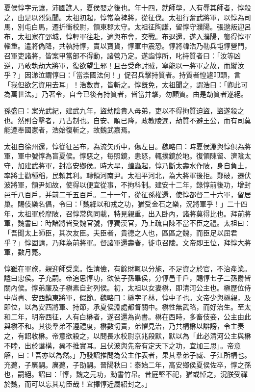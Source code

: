 
\begin{pinyinscope}
夏侯惇字元讓，沛國譙人，夏侯嬰之後也。年十四，就師學，人有辱其師者，惇殺之，由是以烈氣聞。太祖初起，惇常為裨將，從征伐。太祖行奮武將軍，以惇為司馬，別屯白馬，遷折衝校尉，領東郡太守。太祖征陶謙，留惇守濮陽。張邈叛迎呂布，太祖家在鄄城，惇輕軍往赴，適與布會，交戰。布退還，遂入濮陽，襲得惇軍輜重。遣將偽降，共執持惇，責以寶貨，惇軍中震恐。惇將韓浩乃勒兵屯惇營門，召軍吏諸將，皆案甲當部不得動，諸營乃定。遂詣惇所，叱持質者曰：「汝等凶逆，乃敢執劫大將軍，復欲望生邪！且吾受命討賊，寧能以一將軍之故，而縱汝乎？」因涕泣謂惇曰：「當柰國法何！」促召兵擊持質者。持質者惶遽叩頭，言「我但欲乞資用去耳」！浩數責，皆斬之。惇旣免，太祖聞之，謂浩曰：「卿此可為萬世法。」乃著令，自今已後有持質者，皆當并擊，勿顧質。由是劫質者遂絕。

孫盛曰：案光武紀，建武九年，盜劫陰貴人母弟，吏以不得拘質迫盜，盜遂殺之也。然則合擊者，乃古制也。自安、順已降，政教陵遲，劫質不避王公，而有司莫能遵奉國憲者，浩始復斬之，故魏武嘉焉。

太祖自徐州還，惇從征呂布，為流矢所中，傷左目。魏略曰：時夏侯淵與惇俱為將軍，軍中號惇為盲夏侯。惇惡之，每照鏡，恚怒，輒撲鏡於地。復領陳留、濟陰太守，加建武將軍，封高安鄉侯。時大旱，蝗蟲起，惇乃斷太壽水作陂，身自負土，率將士勸種稻，民賴其利。轉領河南尹。太祖平河北，為大將軍後拒。鄴破，遷伏波將軍，領尹如故，使得以便宜從事，不拘科制。建安十二年，錄惇前後功，增封邑千八百戶，并前二千五百戶。二十一年，從征孫權還，使惇都督二十六軍，留居巢。賜伎樂名倡，令曰：「魏絳以和戎之功，猶受金石之樂，況將軍乎！」二十四年，太祖軍於摩陂，召惇常與同載，特見親重，出入卧內，諸將莫得比也。拜前將軍，魏書曰：時諸將皆受魏官號，惇獨漢官，乃上疏自陳不當不臣之禮。太祖曰：「吾聞太上師臣，其次友臣。夫臣者，貴德之人也，區區之魏，而臣足以屈君乎？」惇固請，乃拜為前將軍。督諸軍還壽春，徙屯召陵。文帝即王位，拜惇大將軍，數月薨。

惇雖在軍旅，親迎師受業。性清儉，有餘財輒以分施，不足資之於官，不治產業。謚曰忠侯。子充嗣。帝追思惇功，欲使子孫畢侯，分惇邑千戶，賜惇七子二孫爵皆關內侯。惇弟廉及子楙素自封列侯。初，太祖以女妻楙，即清河公主也。楙歷位侍中尚書、安西鎮東將軍，假節。魏略曰：楙字子林，惇中子也。文帝少與楙親，及即位，以為安西將軍、持節，承夏侯淵處都督關中。楙性無武略，而好治生。至太和二年，明帝西征，人有白楙者，遂召還為尚書。楙在西時，多畜伎妾，公主由此與楙不和。其後羣弟不遵禮度，楙數切責，弟懼見治，乃共構楙以誹謗，令主奏之，有詔收楙。帝意欲殺之，以問長水校尉京兆段默，默以為「此必清河公主與楙不睦，出於譖構，兾不推實耳。且伏波與先帝有定天下之功，宜加三思」。帝意解，曰：「吾亦以為然。」乃發詔推問為公主作表者，果其羣弟子臧、子江所構也。充薨，子廙嗣。廙薨，子劭嗣。晉陽秋曰：泰始二年，高安鄉侯夏侯佐卒，惇之孫也，嗣絕。詔曰：「惇，魏之元功，勳書竹帛。昔庭堅不祀，猶或悼之，況朕受禪於魏，而可以忘其功臣哉！宜擇惇近屬紹封之。」


\end{pinyinscope}
